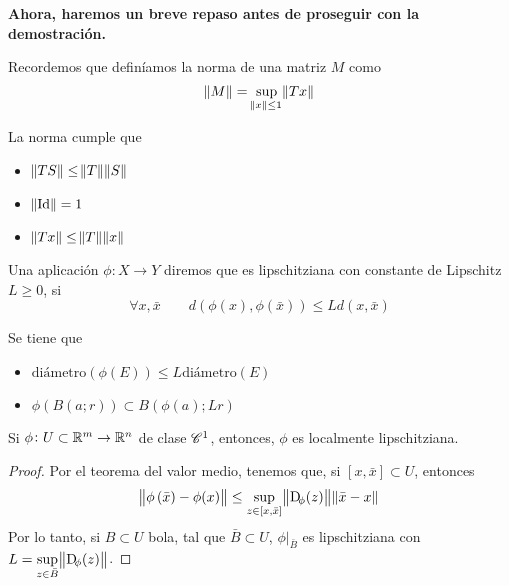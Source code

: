 \textbf{Ahora, haremos un breve repaso antes de proseguir con la demostración.}

\begin{defi}
    Recordemos que definíamos la norma de una matriz $M$ como
    \[
        \norm{M} = \sup_{\norm{x} \leq 1} \norm{T x}
    \]
\end{defi}

\begin{prop}
    La norma cumple que
    \begin{itemize}
        \item $\norm{TS} \leq \norm{T}\norm{S}$
        \item $\norm{\operatorname{Id}} = 1$
        \item $\norm{Tx} \leq \norm{T} \norm{x}$
    \end{itemize}
\end{prop}

\begin{defi}
    Una aplicación $\phi \colon X \to Y$ diremos que es lipschitziana con constante de Lipschitz $L \geq 0$, si
    \[
        \forall x, \bar{x} \qquad
        d\left( \phi(x), \phi\left( \bar{x} \right) \right) \leq L d\left( x, \bar{x} \right)
    \]
\end{defi}

\begin{obs}
    Se tiene que
    \begin{itemize}
        \item $\text{diámetro}\left( \phi(E) \right) \leq L \text{diámetro}(E)$
        \item $\phi\left( B(a; r) \right) \subset B\left( \phi(a); Lr \right)$
    \end{itemize}
\end{obs}

\begin{prop}
    Si $\phi \colon U \subset \mathbb{R}^m \to \mathbb{R}^n$ de clase $\mathscr{C}^1$, entonces, $\phi$ es localmente lipschitziana.
\end{prop}

\begin{proof}
    Por el teorema del valor medio, tenemos que, si $[x, \bar{x}] \subset U$, entonces
    \[
        \norm{\phi\left( \bar{x} \right) - \phi(x)} \leq \sup_{z \in [x, \bar{x}]} \norm{\Dif_\phi(z)} \norm{\bar{x} - x} 
    \]
    Por lo tanto, si $B \subset U$ bola, tal que $\bar{B} \subset U$, $\phi\vert_{\bar{B}}$ es lipschitziana con $L = \sup\limits_{z \in \bar{B}} \norm{\Dif_\phi(z)}$.
\end{proof}

